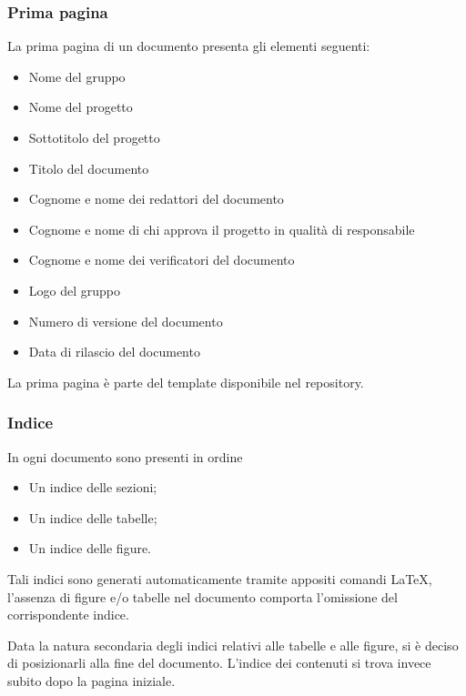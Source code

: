 \documentclass[a4paper]{report}
\begin{document}
	\subsubsection{Prima pagina}
	La prima pagina di un documento presenta gli elementi seguenti:
	\begin{itemize}
		\item Nome del gruppo
		\item Nome del progetto
		\item Sottotitolo del progetto
		\item Titolo del documento
		\item Cognome e nome dei redattori del documento
		\item Cognome e nome di chi approva il progetto in qualità di responsabile
		\item Cognome e nome dei verificatori del documento
		\item Logo del gruppo
		\item Numero di versione del documento
		\item Data di rilascio del documento
	\end{itemize}
	La prima pagina è parte del template disponibile nel repository. 
	\subsubsection{Indice}
		In ogni documento sono presenti in ordine
		\begin{itemize}
			\item Un indice delle sezioni;
			\item Un indice delle tabelle;
			\item Un indice delle figure.
		\end{itemize}
		Tali indici sono generati automaticamente tramite appositi comandi \LaTeX, l'assenza di figure 
		e/o tabelle nel documento comporta l'omissione del corrispondente indice. 
		
	Data la natura secondaria degli indici relativi alle tabelle e alle figure, si è deciso di posizionarli alla fine del documento.
	L'indice dei contenuti si trova invece subito dopo la pagina iniziale.	
\end{document}
